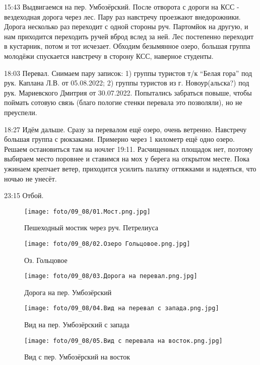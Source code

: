15:43 Выдвигаемся на пер. Умбозёрский. После отворота с дороги на КСС - вездеходная дорога через лес.
Пару раз навстречу проезжают внедорожники. Дорога несколько раз переходит с одной стороны руч. Партомйок на другую,
и нам приходится переходить ручей вброд вслед за ней. Лес постепенно переходит в кустарник, потом и тот исчезает.
Обходим безымянное озеро, большая группа молодёжи спускается навстречу в сторону КСС, наверное студенты.

18:03 Перевал. Снимаем пару записок: 1) группы туристов т/к ``Белая гора'' под рук. Каплана Л.В. от 05.08.2022;
2) группы туристов из г. Новоур(альска?) под рук. Мариевского Дмитрия от 30.07.2022.
Попытались забраться повыше, чтобы поймать сотовую связь (благо пологие стенки перевала это позволяли), но не преуспели.

18:27 Идём дальше. Сразу за перевалом ещё озеро, очень ветренно. Навстречу большая группа с рюкзаками.
Примерно через 1 километр ещё одно озеро. Решаем остановиться там на ночлег 19:11.
Расчищенных площадок нет, поэтому выбираем место поровнее и ставимся на мох у берега на открытом месте.
Пока ужинаем крепчает ветер, приходится усилить палатку оттяжками и надеяться, что ночью не унесёт.

23:15 Отбой.

\begin{figure}
    \centering
    \texttt{[image: foto/09\_08/01.Мост.png.jpg]}
    \caption{Пешеходный мостик через руч. Петрелиуса}
\end{figure}

\begin{figure}
    \centering
    \texttt{[image: foto/09\_08/02.Озеро Гольцовое.png.jpg]}
    \caption{Оз. Гольцовое}
\end{figure}

\begin{figure}
    \centering
    \texttt{[image: foto/09\_08/03.Дорога на перевал.png.jpg]}
    \caption{Дорога на пер. Умбозёрский}
\end{figure}

\begin{figure}
    \centering
    \texttt{[image: foto/09\_08/04.Вид на перевал с запада.png.jpg]}
    \caption{Вид на пер. Умбозёрский с запада}
\end{figure}

\begin{figure}
    \centering
    \texttt{[image: foto/09\_08/05.Вид с перевала на восток.png.jpg]}
    \caption{Вид с пер. Умбозёрский на восток}
\end{figure}

